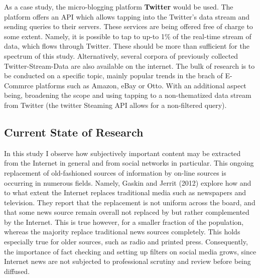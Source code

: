 		\par
		
		As a case study, the micro-blogging platform \textbf{Twitter} would be used. The platform offers an API which allows tapping into the Twitter's data stream and sending queries to their servers. These services are being offered free of charge to some extent. Namely, it is possible to tap to up-to 1\% of the real-time stream of data, which flows through Twitter. These should be more than sufficient for the spectrum of this study. Alternatively, several corpora of previously collected Twitter-Stream-Data are also available on the internet. The bulk of research is to be conducted on  a specific topic, mainly popular trends in the brach of E-Commrce platforms such as Amazon, eBay or Otto. With an additional aspect being, broadening the scope and using tapping to a non-thematized data stream from Twitter (the twitter Steaming API allows for a non-filtered query).
		\par
		
	\subsection{Current State of Research}
		In this study I observe how subjectively important content may be extracted from the Internet in general and from social networks in particular. This ongoing replacement of old-fashioned sources of information by on-line sources is occurring in numerous fields. Namely, Gaskin and Jerrit (2012) \cite{gaskins2012internet} explore how and to what extent the Internet replaces traditional media such as newspapers and television. They report that the replacement is not uniform across the board, and that some news source remain overall not replaced by but rather complemented by the Internet. This is true however, for a smaller fraction of the population, whereas the majority replace traditional news sources completely. This holds especially true for older sources, such as radio and printed press. Consequently, the importance of fact checking and setting up filters on social media grows, since Internet news are not subjected to professional scrutiny and review before being diffused.
		
		\par
		
